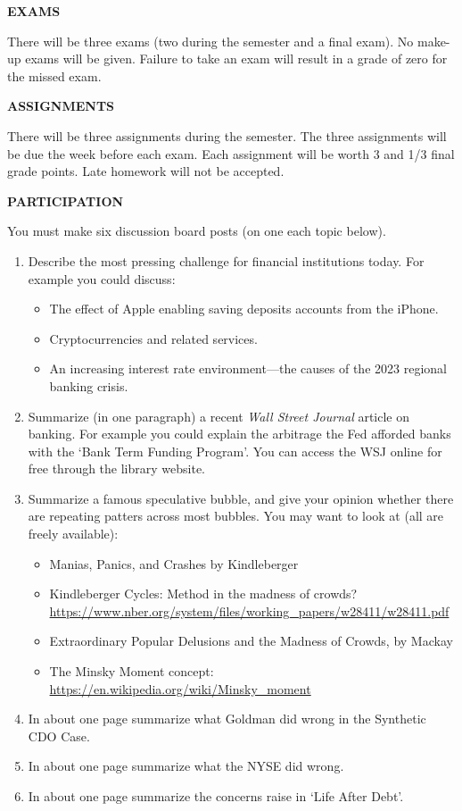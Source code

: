 \documentclass{article}
\begin{document}
\begin{center}
{\bf EXAMS} 
\end{center}
There will be three exams (two during the semester and a final exam). No make-up exams will be given.  Failure to take an exam will result in a grade of zero for the missed exam.  
\begin{center}
{\bf ASSIGNMENTS} 
\end{center}
There will be three assignments during the semester. The three assignments will be due the week before each exam. Each assignment will be worth 3 and 1/3 final grade points. Late homework will not be accepted.
\begin{center}
{\bf PARTICIPATION} 
\end{center}
You must make six discussion board posts (on one each topic below).

\begin{enumerate}
\item Describe the most pressing challenge for financial institutions today.  For example you could discuss:
\begin{itemize}
\item The effect of Apple enabling saving deposits accounts from the iPhone.
\item Cryptocurrencies and related services.
\item An increasing interest rate environment---the causes of the 2023 regional banking crisis.
\end{itemize}

\item Summarize (in one paragraph) a recent {\it Wall Street Journal} article on banking.  For example you could explain the arbitrage the Fed afforded banks with the `Bank Term Funding Program'.  You can access the WSJ online for free through the library website.

\item Summarize a famous speculative bubble, and give your opinion whether there are repeating patters across most bubbles.  You may want to look at (all are freely available):
  \begin{itemize}
  \item Manias, Panics, and Crashes by Kindleberger
  \item Kindleberger Cycles: Method in the madness of crowds? \url{https://www.nber.org/system/files/working_papers/w28411/w28411.pdf}
  \item Extraordinary Popular Delusions and the Madness of Crowds, by Mackay
  \item The Minsky Moment  concept: \url{https://en.wikipedia.org/wiki/Minsky_moment}
  \end{itemize}

\item In about one page summarize what Goldman did wrong in the Synthetic CDO Case.
\item In about one page summarize what the NYSE did wrong.
\item In about one page summarize the concerns raise in `Life After Debt'.
\end{enumerate}
\end{document}
